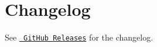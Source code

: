 \chapter{Changelog}
\hypertarget{md_node__modules_2lowlight_2changelog}{}\label{md_node__modules_2lowlight_2changelog}
\label{md_node__modules_2lowlight_2changelog_autotoc_md22084}%
%


See \href{https://github.com/wooorm/lowlight/releases}{\texttt{ Git\+Hub Releases}} for the changelog. 